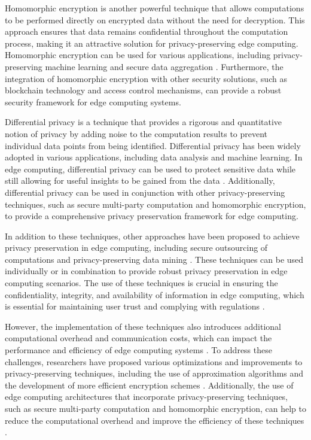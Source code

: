 \documentclass[11pt]{article}
\begin{document}
Homomorphic encryption \cite{ref116} is another powerful technique that allows computations to be performed directly on encrypted data without the need for decryption. This approach ensures that data remains confidential throughout the computation process, making it an attractive solution for privacy-preserving edge computing. Homomorphic encryption can be used for various applications, including privacy-preserving machine learning \cite{ref117} and secure data aggregation \cite{ref118}. Furthermore, the integration of homomorphic encryption with other security solutions, such as blockchain technology and access control mechanisms, can provide a robust security framework for edge computing systems.

Differential privacy \cite{ref119} is a technique that provides a rigorous and quantitative notion of privacy by adding noise to the computation results to prevent individual data points from being identified. Differential privacy has been widely adopted in various applications, including data analysis and machine learning. In edge computing, differential privacy can be used to protect sensitive data while still allowing for useful insights to be gained from the data \cite{ref120}. Additionally, differential privacy can be used in conjunction with other privacy-preserving techniques, such as secure multi-party computation and homomorphic encryption, to provide a comprehensive privacy preservation framework for edge computing.

In addition to these techniques, other approaches have been proposed to achieve privacy preservation in edge computing, including secure outsourcing of computations \cite{ref121} and privacy-preserving data mining \cite{ref122}. These techniques can be used individually or in combination to provide robust privacy preservation in edge computing scenarios. The use of these techniques is crucial in ensuring the confidentiality, integrity, and availability of information in edge computing, which is essential for maintaining user trust and complying with regulations \cite{ref123}.

However, the implementation of these techniques also introduces additional computational overhead and communication costs, which can impact the performance and efficiency of edge computing systems \cite{ref124}. To address these challenges, researchers have proposed various optimizations and improvements to privacy-preserving techniques, including the use of approximation algorithms \cite{ref125} and the development of more efficient encryption schemes \cite{ref126}. Additionally, the use of edge computing architectures that incorporate privacy-preserving techniques, such as secure multi-party computation and homomorphic encryption, can help to reduce the computational overhead and improve the efficiency of these techniques \cite{ref127}.
\end{document}
